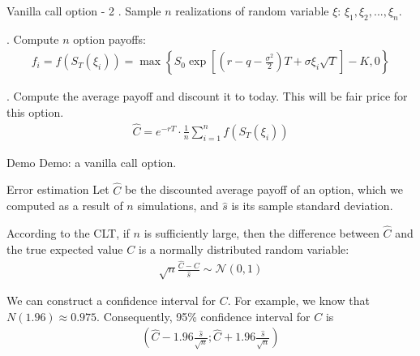 \documentclass{beamer}
\begin{document}
\begin{frame}{Vanilla call option - 2}
. Sample $n$ realizations of random variable $\xi$: $\xi_1, \xi_2, ..., \xi_n$. 

. Compute $n$ option payoffs:
\begin{align*}
f_i = f(S_T(\xi_i)) = \max\left\{S_0 \exp\left[\left(r - q - \frac{\sigma^2}{2}\right)T + \sigma\xi_i\sqrt{T}\right] - K, 0\right\}
\end{align*}

. Compute the average payoff and discount it to today. This will be fair price for this option.
\begin{align*}
\hat{C} = e^{-rT} \cdot \frac{1}{n}\sum\limits_{i=1}^{n}f(S_T(\xi_i))
\end{align*}
\end{frame}



\begin{frame}{Demo}
\justify
Demo: a vanilla call option.
\end{frame}



\begin{frame}{Error estimation}
\justify
Let $\hat{C}$ be the discounted average payoff of an option, which we computed as a result of $n$ simulations, and $\hat{s}$ is its sample standard deviation.

\justify
According to the CLT, if $n$ is sufficiently large, then the difference between $\hat{C}$ and the true expected value $C$ is a normally distributed random variable:
\begin{align*}
\sqrt{n}\frac{\hat{C} - C}{\hat{s}} \sim \mathcal{N}(0, 1)
\end{align*}

\justify
We can construct a confidence interval for $C$. For example, we know that $N(1.96) \approx 0.975$. Consequently, 95\% confidence interval for $C$ is
\begin{align*}
\left(\hat{C} - 1.96\frac{\hat{s}}{\sqrt{n}}; \hat{C} + 1.96\frac{\hat{s}}{\sqrt{n}} \right)
\end{align*}  
\end{frame}
\end{document}
